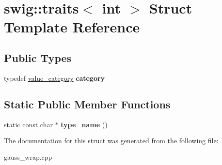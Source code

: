 \hypertarget{structswig_1_1traits_3_01int_01_4}{\section{swig\-:\-:traits$<$ int $>$ Struct Template Reference}
\label{structswig_1_1traits_3_01int_01_4}
}
\subsection*{Public Types}
\begin{DoxyCompactItemize}
\item 
\hypertarget{structswig_1_1traits_3_01int_01_4_a78eaa5a419321572d9679376ae2a8105}{typedef \hyperlink{structswig_1_1value__category}{value\-\_\-category} {\bfseries category}}\label{structswig_1_1traits_3_01int_01_4_a78eaa5a419321572d9679376ae2a8105}

\end{DoxyCompactItemize}
\subsection*{Static Public Member Functions}
\begin{DoxyCompactItemize}
\item 
\hypertarget{structswig_1_1traits_3_01int_01_4_a9b93b5ab0f0397825a5e5621d20ecde3}{static const char $\ast$ {\bfseries type\-\_\-name} ()}\label{structswig_1_1traits_3_01int_01_4_a9b93b5ab0f0397825a5e5621d20ecde3}

\end{DoxyCompactItemize}


The documentation for this struct was generated from the following file\-:\begin{DoxyCompactItemize}
\item 
gauss\-\_\-wrap.\-cpp\end{DoxyCompactItemize}
